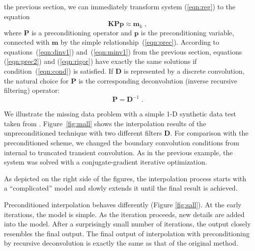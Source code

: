 the previous section, we can immediately transform system
(\ref{eqn:reg}) to the equation
\begin{equation}
\mathbf{K P p} \approx  \mathbf{m}_k\;,
\label{eqn:prec2}
\end{equation}
where $\mathbf{P}$ is a preconditioning operator and $\mathbf{p}$ is the
preconditioning variable, connected with $\mathbf{m}$ by the simple
relationship~(\ref{eqn:prec}).  According to equations~(\ref{eqn:dinv1})
and~(\ref{eqn:minv1}) from the previous section, equations
(\ref{eqn:prec2}) and (\ref{eqn:rigor}) have exactly the same
solutions if condition~(\ref{eqn:cond}) is satisfied.  If $\mathbf{D}$ is
represented by a discrete convolution, the natural choice for
$\mathbf{P}$ is the corresponding deconvolution (inverse recursive
filtering) operator:
\begin{equation}
\mathbf{P}  = \mathbf{D}^{-1}\;.
\label{eqn:decon}
\end{equation}

We illustrate the missing data problem with a simple 1-D synthetic data
test taken from \cite{gee}.  Figure~\ref{fig:mall} shows the
interpolation results of the unpreconditioned technique with two
different filters $\mathbf{D}$. For comparison with the preconditioned scheme, we
changed the boundary convolution conditions from internal to truncated
transient convolution. As in the previous example, the system was
solved with a conjugate-gradient iterative optimization.


As depicted on the right side of the figures, the interpolation
process starts with a ``complicated'' model and slowly extends
it until the final result is achieved. 

Preconditioned interpolation behaves differently (Figure
\ref{fig:sall}). At the early iterations, the model is simple. As the
iteration proceeds, new details are added into the model.  After a
surprisingly small number of iterations, the output closely resembles
the final output. The final output of interpolation with
preconditioning by recursive deconvolution is exactly
the same as that of the original method.


